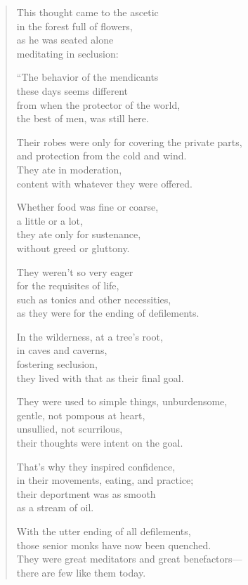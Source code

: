 \documentclass[12pt,openany]{book}%
\begin{document}
\begin{verse}%
This thought came to the ascetic \\
in the forest full of flowers, \\
as he was seated alone \\
meditating in seclusion: 

“The behavior of the mendicants \\
these days seems different \\
from when the protector of the world, \\
the best of men, was still here. 

Their robes were only for covering the private parts, \\
and protection from the cold and wind. \\
They ate in moderation, \\
content with whatever they were offered. 

Whether food was fine or coarse, \\
a little or a lot, \\
they ate only for sustenance, \\
without greed or gluttony. 

They weren’t so very eager \\
for the requisites of life, \\
such as tonics and other necessities, \\
as they were for the ending of defilements. 

In the wilderness, at a tree’s root, \\
in caves and caverns, \\
fostering seclusion, \\
they lived with that as their final goal. 

They were used to simple things, unburdensome, \\
gentle, not pompous at heart, \\
unsullied, not scurrilous, \\
their thoughts were intent on the goal. 

That’s why they inspired confidence, \\
in their movements, eating, and practice; \\
their deportment was as smooth \\
as a stream of oil. 

With the utter ending of all defilements, \\
those senior monks have now been quenched. \\
They were great meditators and great benefactors—\\
there are few like them today. 


\end{verse}
\end{document}
